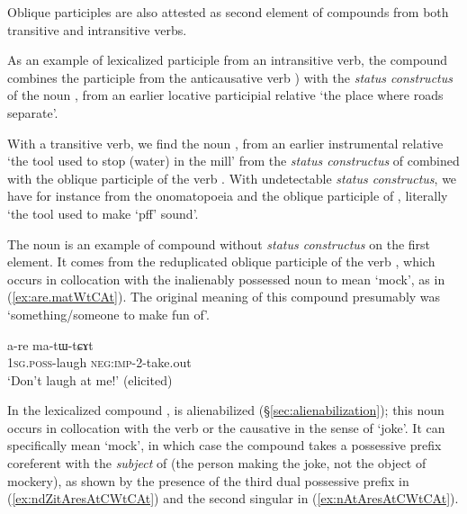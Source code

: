 Oblique participles are also attested as second element of compounds from both transitive and intransitive verbs. 

As an example of lexicalized participle from an intransitive verb, the compound  combines the participle  from the anticausative verb ) with the \textit{status constructus} of the noun , from an earlier locative participial relative  `the place where roads separate'. 

With a transitive verb, we find the noun , from an earlier instrumental relative  `the tool used to stop (water) in the mill' from the \textit{status constructus}  of  combined with the oblique participle  of the verb . With undetectable \textit{status constructus}, we have for instance  from the  onomatopoeia  and the oblique participle of , literally `the tool used to make `pff' sound'. 

The noun  is an example of compound without \textit{status constructus} on the first element. It comes from the reduplicated oblique participle of the verb , which occurs in collocation with the inalienably possessed noun  to mean `mock', as in (\ref{ex:are.matWtCAt}). The original meaning of this compound presumably was `something/someone to make fun of'.

\begin{exe}
\ex \label{ex:are.matWtCAt}
\gll a-re ma-tɯ-tɕɤt \\
\textsc{1sg}.\textsc{poss}-laugh \textsc{neg}:\textsc{imp}-2-take.out \\
\glt `Don't laugh at me!' (elicited)
\end{exe}

In the lexicalized compound ,  is alienabilized (§\ref{sec:alienabilization}); this noun occurs in collocation with the verb  or the causative  in the sense of `joke'. It can specifically mean `mock', in which case the compound  takes a possessive prefix coreferent with the \textit{subject} of  (the person making the joke, not the object of mockery), as shown by the presence of the third dual possessive prefix  in (\ref{ex:ndZitAresAtCWtCAt}) and the second singular  in (\ref{ex:nAtAresAtCWtCAt}).

